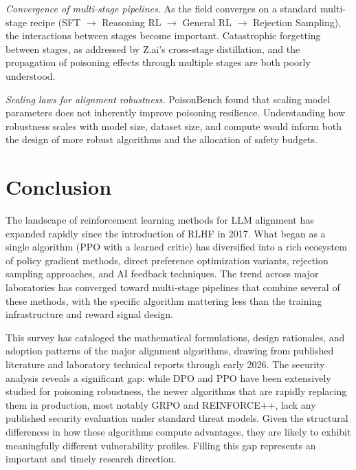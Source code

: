 \documentclass[12pt]{article}
\begin{document}
\textit{Convergence of multi-stage pipelines.} As the field converges on a standard multi-stage recipe (SFT $\rightarrow$ Reasoning RL $\rightarrow$ General RL $\rightarrow$ Rejection Sampling), the interactions between stages become important. Catastrophic forgetting between stages, as addressed by Z.ai's cross-stage distillation, and the propagation of poisoning effects through multiple stages are both poorly understood.

\textit{Scaling laws for alignment robustness.} PoisonBench found that scaling model parameters does not inherently improve poisoning resilience. Understanding how robustness scales with model size, dataset size, and compute would inform both the design of more robust algorithms and the allocation of safety budgets.


\section{Conclusion}

The landscape of reinforcement learning methods for LLM alignment has expanded rapidly since the introduction of RLHF in 2017. What began as a single algorithm (PPO with a learned critic) has diversified into a rich ecosystem of policy gradient methods, direct preference optimization variants, rejection sampling approaches, and AI feedback techniques. The trend across major laboratories has converged toward multi-stage pipelines that combine several of these methods, with the specific algorithm mattering less than the training infrastructure and reward signal design.

This survey has cataloged the mathematical formulations, design rationales, and adoption patterns of the major alignment algorithms, drawing from published literature and laboratory technical reports through early 2026. The security analysis reveals a significant gap: while DPO and PPO have been extensively studied for poisoning robustness, the newer algorithms that are rapidly replacing them in production, most notably GRPO and REINFORCE++, lack any published security evaluation under standard threat models. Given the structural differences in how these algorithms compute advantages, they are likely to exhibit meaningfully different vulnerability profiles. Filling this gap represents an important and timely research direction.

\nocite{*}


\end{document}
